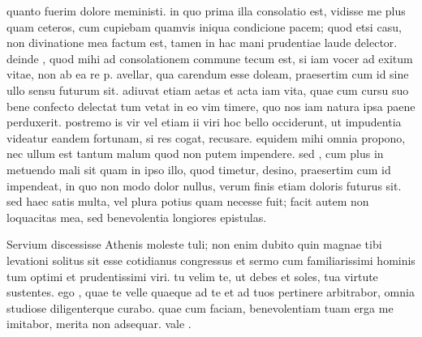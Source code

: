  quanto fuerim dolore meministi. in quo prima illa consolatio est, vidisse me plus quam ceteros, cum cupiebam quamvis iniqua condicione pacem; quod etsi casu, non divinatione mea factum est, tamen in hac mani prudentiae laude delector. deinde , quod mihi ad consolationem commune tecum est, si iam vocer ad exitum vitae, non ab ea re p. avellar, qua carendum esse doleam, praesertim cum id sine ullo sensu futurum sit. adiuvat etiam aetas et acta iam vita, quae cum cursu suo bene confecto delectat tum vetat in eo vim timere, quo nos iam natura ipsa paene perduxerit. postremo is vir vel etiam ii viri hoc bello occiderunt, ut impudentia videatur eandem fortunam, si res cogat, recusare. equidem mihi omnia propono, nec ullum est tantum malum quod non putem impendere. sed , cum plus in metuendo mali sit quam in ipso illo, quod timetur, desino, praesertim cum id impendeat, in quo non modo dolor nullus, verum finis etiam doloris futurus sit. sed haec satis multa, vel plura potius quam necesse fuit; facit autem non loquacitas mea, sed benevolentia longiores epistulas.

 Servium discessisse Athenis moleste tuli; non enim dubito quin magnae tibi levationi solitus sit esse cotidianus congressus et sermo cum familiarissimi hominis tum optimi et prudentissimi viri. tu velim te, ut debes et soles, tua virtute sustentes. ego , quae te velle quaeque ad te et ad tuos pertinere arbitrabor, omnia studiose diligenterque curabo. quae cum faciam, benevolentiam tuam erga me imitabor, merita non adsequar. vale .
